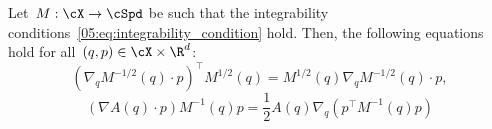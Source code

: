 \begin{lemma}
    \label{05:lemma:commutation}
    Let~$M:\cX\to\cSpd$ be such that the integrability conditions~\eqref{05:eq:integrability_condition} hold. Then, the following equations hold for all~$(q,p)\in\cX\times\R^d$:
    \begin{equation}
        \label{05:eq:commutation}
        \left(\nabla_q M^{-1/2}(q)\cdot p\right)^\top M^{1/2}(q) = M^{1/2}(q)\nabla_q M^{-1/2}(q)\cdot p,
    \end{equation}
    \begin{equation}
        \label{05:eq:derivative_identity}
        \left(\nabla A(q)\cdot p\right)M^{-1}(q)p = \frac12 A(q)\nabla_q\left(p^\top M^{-1}(q)p\right)
    \end{equation}
\end{lemma}

